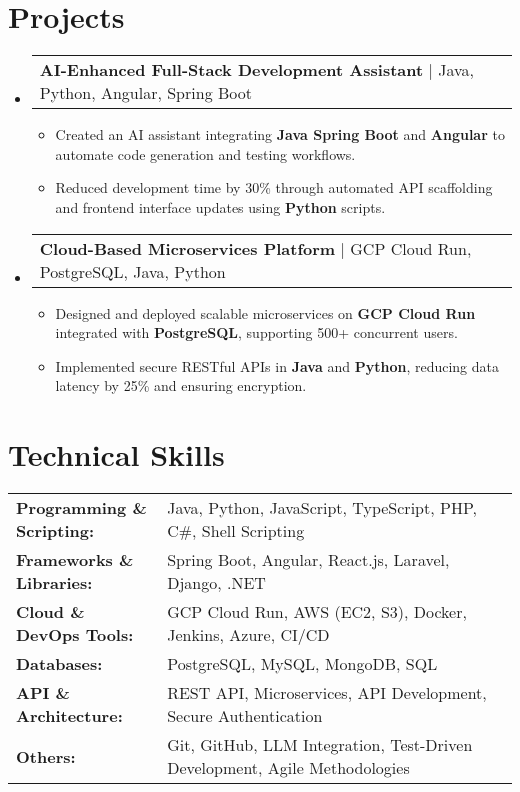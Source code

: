 \documentclass[letterpaper,11pt]{article}
\makeatletter
\newcommand{\resumeItem}[1]{
  \item\footnotesize{
    {#1 \vspace{-2pt}}
  }
}
\newcommand{\resumeProjectHeading}[2]{
    \item
    \begin{tabular*}{1.001\textwidth}{l@{\extracolsep{\fill}}r}
      \small#1 & \textbf{\small #2}\\
    \end{tabular*}\vspace{-7pt}
}
\newcommand{\resumeSubHeadingListStart}{\begin{itemize}[leftmargin=0pt, label={}]}
\newcommand{\resumeSubHeadingListEnd}{\end{itemize}}
\newcommand{\resumeItemListStart}{\begin{itemize}[leftmargin=*]}
\newcommand{\resumeItemListEnd}{\end{itemize}\vspace{-5pt}}
\makeatother
\begin{document}
\section{Projects}
    \vspace{-5pt}
    \resumeSubHeadingListStart
      \resumeProjectHeading
          {\textbf{AI-Enhanced Full-Stack Development Assistant} | Java, Python, Angular, Spring Boot}
          {}
          \resumeItemListStart
              \resumeItem{Created an AI assistant integrating \textbf{Java Spring Boot} and \textbf{Angular} to automate code generation and testing workflows.}
              \resumeItem{Reduced development time by 30\% through automated API scaffolding and frontend interface updates using \textbf{Python} scripts.}
          \resumeItemListEnd
          \vspace{-16pt}
      \resumeProjectHeading
          {\textbf{Cloud-Based Microservices Platform} | GCP Cloud Run, PostgreSQL, Java, Python}
          {}
          \resumeItemListStart
              \resumeItem{Designed and deployed scalable microservices on \textbf{GCP Cloud Run} integrated with \textbf{PostgreSQL}, supporting 500+ concurrent users.}
              \resumeItem{Implemented secure RESTful APIs in \textbf{Java} and \textbf{Python}, reducing data latency by 25\% and ensuring encryption.}
          \resumeItemListEnd
    \resumeSubHeadingListEnd
\vspace{-10pt}
\section{Technical Skills}
        \vspace{-14pt}
        \begin{table}[h]
            \footnotesize
            \begin{tabular}{p{0.3\linewidth} p{0.7\linewidth}}
                \textbf{Programming \& Scripting:} & Java, Python, JavaScript, TypeScript, PHP, C\#, Shell Scripting \\
                \textbf{Frameworks \& Libraries:} & Spring Boot, Angular, React.js, Laravel, Django, .NET \\
                \textbf{Cloud \& DevOps Tools:} & GCP Cloud Run, AWS (EC2, S3), Docker, Jenkins, Azure, CI/CD \\
                \textbf{Databases:} & PostgreSQL, MySQL, MongoDB, SQL \\
                \textbf{API \& Architecture:} & REST API, Microservices, API Development, Secure Authentication \\
                \textbf{Others:} & Git, GitHub, LLM Integration, Test-Driven Development, Agile Methodologies \\
            \end{tabular}
        \end{table}
\end{document}
